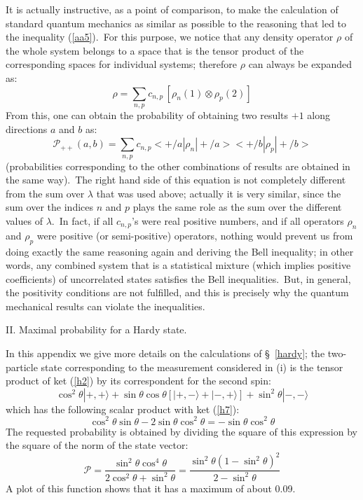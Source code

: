 \documentclass[12pt,onecolumn]{article}%
\begin{document}
It is actually instructive, as a point of comparison, to make the calculation
of standard quantum mechanics as similar as possible to the reasoning that led
to the inequality (\ref{aa5}).\ For this purpose, we notice that any density
operator $\rho$ of the whole system belongs to a space that is the tensor
product of the corresponding spaces for individual systems; therefore $\rho$
can always be expanded as:%
\begin{equation}
\rho=\sum_{n,p}c_{n,p}\,\left[  \rho_{n}(1)\otimes\rho_{p}(2)\right]
\label{aa6}%
\end{equation}
From this, one can obtain the probability of obtaining two results $+1$ along
directions $a$ and $b$ as:%
\begin{equation}
\mathcal{P}_{++}(a,b)=\sum_{n,p}c_{n,p}<+/a|\rho_{n}|+/a><+/b|
\rho_{p}|+/b> \label{aa7}%
\end{equation}
(probabilities corresponding to the other combinations of results are obtained
in the same way).\ The right hand side of this equation is not completely
different from the sum over $\lambda$ that was used above; actually it is very
similar, since the sum over the indices $n$ and $p$ plays the same role as the
sum over the different values of $\lambda$.\ In fact, if all $c_{n,p}$'s were
real positive numbers, and if all operators $\rho_{n}$ and $\rho_{p}$ were
positive (or semi-positive) operators, nothing would prevent us from doing
exactly the same reasoning again and deriving the Bell inequality; in other
words, any combined system that is a statistical mixture (which implies
positive coefficients) of uncorrelated states satisfies the Bell
inequalities.\ But, in general, the positivity conditions are not fulfilled,
and this is precisely why the quantum mechanical results can violate the
inequalities. \bigskip\bigskip

\begin{center}
II. Maximal probability for a Hardy state.
\end{center}

In this appendix we give more details on the calculations of \S \ \ref{hardy};
the two-particle state corresponding to the measurement considered in (i) is
the tensor product of ket (\ref{h2}) by its correspondent for the second
spin:
\begin{equation}
\cos^{2}\theta|+,+\rangle +\sin\theta\cos\theta\left[  |+,-\rangle +|-,+\rangle \right]
+\sin^{2}\theta|-,-\rangle  \label{c1}%
\end{equation}
which has the following scalar product with ket (\ref{h7}):
\begin{equation}
\cos^{2}\theta\sin\theta-2\sin\theta\cos^{2}\theta=-\sin\theta\cos^{2}%
\theta\label{c2}%
\end{equation}
The requested probability is obtained by dividing the square of this
expression by the square of the norm of the state vector:
\begin{equation}
\mathcal{P}=\frac{\sin^{2}\theta\cos^{4}\theta}{2\cos^{2}\theta+\sin^{2}%
\theta}=\frac{\sin^{2}\theta\left(  1-\sin^{2}\theta\right)  ^{2}}{2-\sin
^{2}\theta} \label{c3}%
\end{equation}
A plot of this function shows that it has a maximum of about 0.09.
\end{document}
